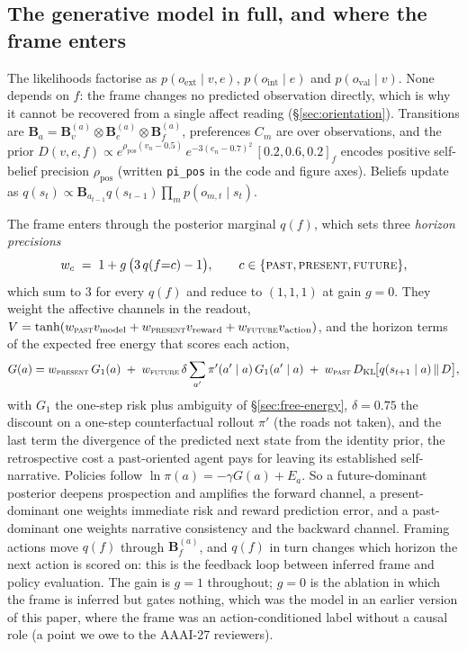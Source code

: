 \documentclass[11pt,a4paper]{article}
\begin{document}
\subsection{The generative model in full, and where the frame enters}\label{sec:fullmodel}
The likelihoods factorise as $p(o_{\text{ext}}\mid v,e)$, $p(o_{\text{int}}\mid e)$ and
$p(o_{\text{val}}\mid v)$. None depends on $f$: the frame changes no predicted
observation directly, which is why it cannot be recovered from a single affect reading
(\S\ref{sec:orientation}). Transitions are $\mathbf B_a=\mathbf B_v^{(a)}\otimes\mathbf
B_e^{(a)}\otimes\mathbf B_f^{(a)}$, preferences $C_m$ are over observations, and the
prior $D(v,e,f)\propto e^{\rho_{\text{pos}}(v_n-0.5)}\,e^{-3(e_n-0.7)^2}\,[0.2,0.6,0.2]_f$
encodes positive self-belief precision $\rho_{\text{pos}}$ (written
\texttt{pi\_pos} in the code and figure axes). Beliefs update as
$q(s_t)\propto \mathbf B_{a_{t-1}}q(s_{t-1})\prod_m p(o_{m,t}\mid s_t)$.

The frame enters through the posterior marginal $q(f)$, which sets three
\emph{horizon precisions}
\begin{equation}
w_c \;=\; 1+g\,\big(3\,q(f{=}c)-1\big),\qquad c\in\{\textsc{past},\textsc{present},\textsc{future}\},
\label{eq:frameweights}
\end{equation}
which sum to $3$ for every $q(f)$ and reduce to $(1,1,1)$ at gain $g=0$. They weight
the affective channels in the readout,
$V=\tanh(w_{\textsc{past}}v_{\text{model}}+w_{\textsc{present}}v_{\text{reward}}+w_{\textsc{future}}v_{\text{action}})$,
and the horizon terms of the expected free energy that scores each action,
\begin{equation}
G(a)=w_{\textsc{present}}\,G_1(a)\;+\;w_{\textsc{future}}\,\delta\sum_{a'}\pi'(a'\mid a)\,G_1(a'\mid a)\;+\;w_{\textsc{past}}\,D_{\mathrm{KL}}\!\big[q(s_{t+1}\mid a)\,\|\,D\big],
\label{eq:gatedefe}
\end{equation}
with $G_1$ the one-step risk plus ambiguity of \S\ref{sec:free-energy}, $\delta=0.75$
the discount on a one-step counterfactual rollout $\pi'$ (the roads not taken), and the
last term the divergence of the predicted next state from the identity prior, the
retrospective cost a past-oriented agent pays for leaving its established
self-narrative. Policies follow $\ln\pi(a)=-\gamma G(a)+E_a$. So a future-dominant
posterior deepens prospection and amplifies the forward channel, a present-dominant one
weights immediate risk and reward prediction error, and a past-dominant one weights
narrative consistency and the backward channel. Framing actions move $q(f)$ through
$\mathbf B_f^{(a)}$, and $q(f)$ in turn changes which horizon the next action is
scored on: this is the feedback loop between inferred frame and policy evaluation.
The gain is $g=1$ throughout; $g=0$ is the ablation in which the frame is inferred but
gates nothing, which was the model in an earlier version of this paper, where the
frame was an action-conditioned label without a causal role (a point we owe to the
AAAI-27 reviewers).
\end{document}
